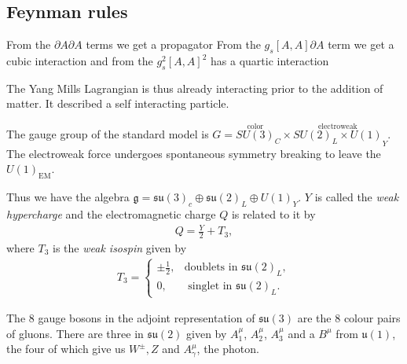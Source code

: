 \subsection{Feynman rules}


From  the $\partial A \partial A$ terms we get a propagator 
From the $g_s \left[ A, A \right] \partial A$ term we get a cubic interaction
and from the $g_s^2 \left[ A, A \right]^2$ has a quartic interaction


The Yang Mills Lagrangian is thus already interacting prior to the addition of matter. It described a self interacting particle.

The gauge group of the standard model is $G = \overset{\text{color}}{SU \left( 3 \right)}_C \times  \overset{\text{electroweak}}{SU \left( 2 \right)_L \times  U \left( 1 \right)}_Y$. The electroweak force undergoes spontaneous symmetry breaking to leave the $U\left( 1 \right)_{\text{EM}}$. 

Thus we have the algebra $\mathfrak{g} = \mathfrak{su}\left( 3 \right)_c \oplus \mathfrak{su}\left( 2 \right)_L \oplus U\left( 1 \right)_Y$.  $Y$ is called the \textit{weak hypercharge} and the electromagnetic charge $Q$ is related to it by
\begin{align}
    Q = \frac{Y}{2} + T_3
,\end{align}
where $T_3$ is the \textit{weak isospin} given by
\begin{align}
    T_3 = \begin{cases}
        \pm \frac{1}{2}, & \text{doublets in $\mathfrak{su}\left( 2 \right)_L$}, \\
        0, & \text{~singlet in $\mathfrak{su}\left( 2 \right)_L$.}
    \end{cases}
\end{align}

The 8 gauge bosons in the adjoint representation of $\mathfrak{su}\left( 3 \right) $ are the 8 colour pairs of gluons. There are three in $\mathfrak{su}\left( 2 \right) $ given by $A^{\mu}_1$, $A^{\mu}_2$, $A^{\mu}_3$ and a $B^{\mu}$ from $\mathfrak{u}\left( 1 \right) $, the four of which give us $W^{\pm}, Z$ and $A^{\mu}_\gamma$, the photon.

